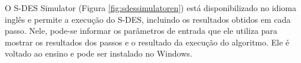 O S-DES Simulator (Figura \ref{fig:sdessimulatoren}) está disponibilizado no idioma inglês e permite a execução do S-DES, incluindo os resultados obtidos em cada passo. Nele, pode-se informar os parâmetros de entrada que ele utiliza para mostrar os resultados dos passos e o resultado da execução do algoritmo. Ele é voltado ao ensino e pode ser instalado no Windows. \cite{permadi18}





